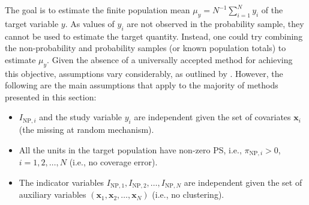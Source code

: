 \documentclass[
]{jss}
\begin{document}
\begin{table}[ht!]
    \centering
    \caption{Two-sample setting with no overlap between samples.}
    \label{tab-two-sources}
\end{table}

The goal is to estimate the finite population mean
\(\mu_{y} = N^{-1}\sum_{i=1}^{N} y_{i}\) of the target variable \(y\).
As values of \(y_{i}\) are not observed in the probability sample, they
cannot be used to estimate the target quantity. Instead, one could try
combining the non-probability and probability samples (or known
population totals) to estimate \(\mu_{y}\). Given the absence of a
universally accepted method for achieving this objective, assumptions
vary considerably, as outlined by \citet{wu2022statistical}. However,
the following are the main assumptions that apply to the majority of
methods presented in this section:

\begin{itemize}
\item[A1] $I_{\text{NP},i}$ and the study variable $y_{i}$ are independent given the set of covariates $\boldsymbol{x}_{i}$ (the missing at random mechanism).
\item[A2] All the units in the target population have non-zero PS, i.e., $\pi_{\text{NP},i}>0$, $i=1,2, \ldots, N$ (i.e., no coverage error).
\item[A3] The indicator variables $I_{\text{NP},1}, I_{\text{NP},2}, \ldots, I_{\text{NP},N}$ are independent given the set of auxiliary variables $\left(\boldsymbol{x}_1, \boldsymbol{x}_2, \ldots, \boldsymbol{x}_N\right)$ (i.e., no clustering).
\end{itemize}
\end{document}
